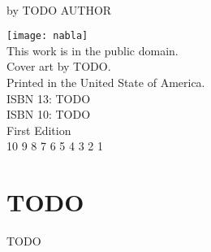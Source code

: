 \documentclass[11pt,openany]{memoir}
\begin{document}
\frontmatter

\vspace*{\droptitle}
\begin{center}
\vspace*{1.0in}
 \\
\vspace*{1.0in}
\Large{by TODO AUTHOR} \\
\end{center}
\thispagestyle{empty}

\newpage
\vspace*{1.0in}
\begin{center}
\texttt{[image: nabla]} \\
\vspace*{0.4in}
This work is in the public domain. \\
Cover art by TODO. \\
Printed in the United State of America. \\
\vspace*{0.4in}
ISBN 13: TODO \\
ISBN 10: TODO \\
\vspace*{0.4in}
First Edition \\
10 9 8 7 6 5 4 3 2 1 \\
\end{center}
\thispagestyle{empty}

\newpage
{}
\renewcommand*{\cftchapterfont}{\normalfont}
\renewcommand*{\cftchapterpagefont}{\normalfont}
\begin{large}
\tableofcontents*
\end{large}
\thispagestyle{empty}

\mainmatter

\chapter{TODO}
TODO

\newpage\null\thispagestyle{empty}\newpage
\end{document}
